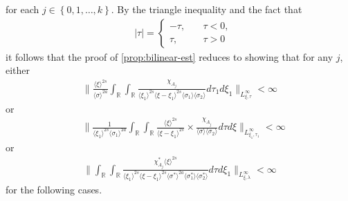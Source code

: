 \documentclass[12pt,reqno]{amsart}
\numberwithin{equation}{section}  %
\numberwithin{figure}{section}
\newcommand{\rr}{\mathbb{R}}
\theoremstyle{plain}
\theoremstyle{definition}
\theoremstyle{remark}
\begin{document}
for each $j \in \left\{ 0,1,\dots,k \right\}$. 
By the triangle inequality and the fact that 
%
%
\begin{equation*}
\begin{split}
& | \tau | =
\begin{cases}
  - \tau, \quad & \tau < 0, 
\\
\tau, \quad & \tau > 0
\end{cases}
\end{split}
\end{equation*}
%
%
it follows that the proof of \autoref{prop:bilinear-est} reduces to showing that
for any $j$, either 
%
%
\begin{equation}
  \label{sup-est-gen-1}
  \begin{split}
    \| \frac{ \langle \xi
    \rangle ^{2s}}{\langle \sigma \rangle ^{2a}}
    \int_{\rr} \int_{\rr} \frac{\chi_{A_{j}}}{ \langle \xi_{1} \rangle ^{2s} \langle \xi-\xi_{1} \rangle ^{2s} 
    \langle \sigma_{1} \rangle \langle  \sigma_{2} \rangle }
    d \tau_1 d \xi_{1} \|_{L^{\infty}_{\xi, \tau}} < \infty
  \end{split}
\end{equation}
%
%
or 
\begin{equation}
  \label{sup-est-gen-2}
\begin{split}
  & \| \frac{1}{\langle \xi_{1} \rangle ^{2s}
  \langle \sigma_{1} \rangle
  ^{2a}} \int_{\rr} \int_{\rr} \frac{\langle \xi \rangle ^{2s}}{\langle
  \xi - \xi_{1}\rangle ^{2s}}  \times \frac{\chi_{A_{j}}}{\langle
  \sigma \rangle  \langle \sigma_{2} \rangle } d \tau d \xi
  \|_{L^{\infty}_{\xi_{1}, \tau_{1}}} < \infty
\end{split}
\end{equation}
%
or
\begin{equation}
  \label{sup-est-gen-3}
\begin{split}
  \| \int_{\rr}  \int_{\rr} \frac{\chi^{*}_{A_{j}}
    \langle \xi \rangle ^{2s}
    }{ \langle \xi_{1} \rangle^{2s} \langle
    \xi-\xi_{1} \rangle ^{2s} \langle \sigma^{*}  
    \rangle ^{2a}
    \langle \sigma_{1}^{*} \rangle
    \langle  \sigma_{2}^{*} \rangle  } d \tau d \xi_{1}  \|_{L^{\infty}_{\xi, \lambda}}
    < \infty
\end{split}
\end{equation}
%
for the following cases.
\end{document}
